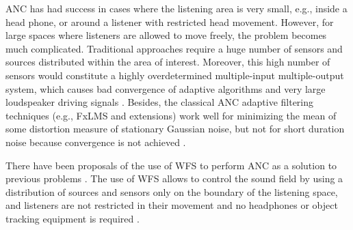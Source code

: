 ANC has had success in cases where the listening area is very small, e.g., inside a head phone, or around a listener with restricted head movement. However, for large spaces where listeners are allowed to move freely, the problem becomes much complicated. Traditional approaches require a huge number of sensors and sources distributed within the area of interest. Moreover, this high number of sensors would constitute a highly overdetermined multiple-input multiple-output system, which causes bad convergence of adaptive algorithms and very large loudspeaker driving signals \cite{Kuntz2004}. Besides, the classical ANC adaptive filtering techniques (e.g., FxLMS and extensions) work well for minimizing the mean of some distortion measure of stationary Gaussian noise, but not for short duration noise because convergence is not achieved \cite{Lapini2016}.

There have been proposals of the use of WFS to perform ANC as a solution to previous problems \cite{Zanolin1999} \cite{Kuntz2004} \cite{Lapini2016} \cite{Morcillo2015}. The use of WFS allows to control the sound field by using a distribution of sources and sensors only on the boundary of the listening space, and listeners are not restricted in their movement and no headphones or object tracking equipment is required \cite{Kuntz2004}.

